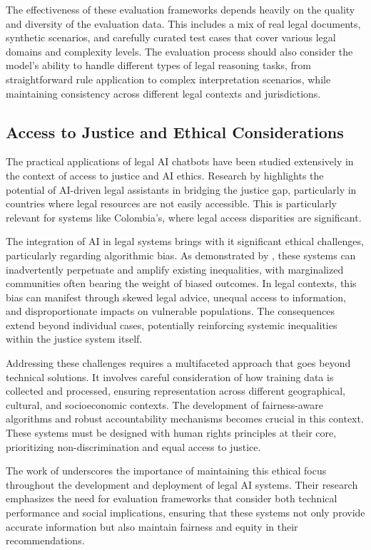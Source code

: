 The effectiveness of these evaluation frameworks depends heavily on the quality and diversity of the evaluation 
data. This includes a mix of real legal documents, synthetic scenarios, and carefully curated test cases that 
cover various legal domains and complexity levels. The evaluation process should also consider the model's 
ability to handle different types of legal reasoning tasks, from straightforward rule application to complex 
interpretation scenarios, while maintaining consistency across different legal contexts and jurisdictions.

\subsection{Access to Justice and Ethical Considerations}
The practical applications of legal AI chatbots have been studied extensively 
in the context of access to justice and AI ethics. Research by \cite{chakraborty2023revolutionizing} 
highlights the potential of AI-driven legal assistants in bridging the justice gap, particularly 
in countries where legal resources are not easily accessible. This is particularly relevant for 
systems like Colombia's, where legal access disparities are significant. 

The integration of AI in legal systems brings with it significant ethical challenges, particularly 
regarding algorithmic bias. As demonstrated by \cite{Min_bias}, these systems can inadvertently 
perpetuate and amplify existing inequalities, with marginalized communities often bearing the weight 
of biased outcomes. In legal contexts, this bias can manifest through skewed legal advice, 
unequal access to information, and disproportionate impacts on vulnerable populations. The 
consequences extend beyond individual cases, potentially reinforcing systemic inequalities 
within the justice system itself.

Addressing these challenges requires a multifaceted approach that goes beyond technical solutions. 
It involves careful consideration of how training data is collected and processed, ensuring 
representation across different geographical, cultural, and socioeconomic contexts. The development 
of fairness-aware algorithms and robust accountability mechanisms becomes crucial in this context. 
These systems must be designed with human rights principles at their core, prioritizing 
non-discrimination and equal access to justice.

The work of \cite{guha2023legalbench} underscores the importance of maintaining this ethical 
focus throughout the development and deployment of legal AI systems. Their research emphasizes 
the need for evaluation frameworks that consider both technical performance and social implications, 
ensuring that these systems not only provide accurate information but also maintain fairness 
and equity in their recommendations.

